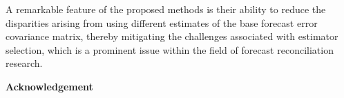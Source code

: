 \documentclass[11pt,a4paper,]{article}
\begin{document}
A remarkable feature of the proposed methods is their ability to reduce
the disparities arising from using different estimates of the base
forecast error covariance matrix, thereby mitigating the challenges
associated with estimator selection, which is a prominent issue within
the field of forecast reconciliation research.

\textbf{\large{Acknowledgement}}

\printbibliography
\end{document}
